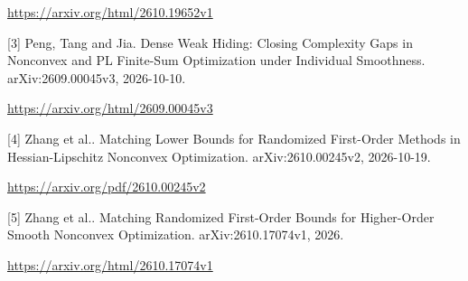 \documentclass[10pt,a4paper]{article}
\begin{document}
\url{https://arxiv.org/html/2610.19652v1}

[3] Peng, Tang and Jia. Dense Weak Hiding: Closing Complexity Gaps in Nonconvex and PL Finite-Sum Optimization under Individual Smoothness. arXiv:2609.00045v3, 2026-10-10.

\url{https://arxiv.org/html/2609.00045v3}

[4] Zhang et al.. Matching Lower Bounds for Randomized First-Order Methods in Hessian-Lipschitz Nonconvex Optimization. arXiv:2610.00245v2, 2026-10-19.

\url{https://arxiv.org/pdf/2610.00245v2}

[5] Zhang et al.. Matching Randomized First-Order Bounds for Higher-Order Smooth Nonconvex Optimization. arXiv:2610.17074v1, 2026.

\url{https://arxiv.org/html/2610.17074v1}
\end{document}
